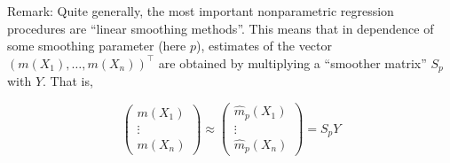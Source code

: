 \documentclass[14pt]{extreport}\usepackage[]{graphicx}\usepackage[]{xcolor}
\begin{document}
Remark: Quite generally, the most important nonparametric regression procedures are ``linear smoothing methods''. This means that in dependence of some smoothing parameter (here $p$), estimates of the vector
$(m(X_1),\dots,m(X_n))^\top $ are obtained by multiplying a ``smoother matrix'' $S_p$ with $Y$. That is, 

$$
\left(\begin{array}{c}
m(X_1)\\
\vdots%
\\ m(X_n)
\end{array}\right)\approx
\left(\begin{array}{c}
{\hat m}_p(X_1)\\
\vdots%
\\ {\hat m}_p(X_n)
\end{array}\right)=S_p Y
$$


\newpage
\end{document}

